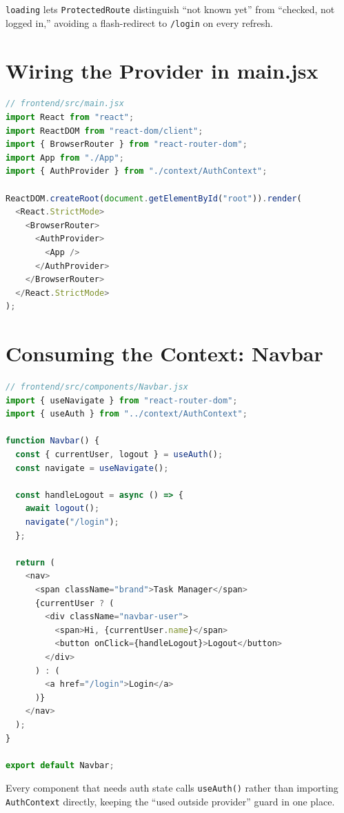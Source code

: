 \begin{notebox}[NOTE]
\texttt{loading} lets \texttt{ProtectedRoute} distinguish ``not known yet''
from ``checked, not logged in,'' avoiding a flash-redirect to
\texttt{/login} on every refresh.
\end{notebox}

\section{Wiring the Provider in main.jsx}

\begin{lstlisting}[language=JavaScript]
// frontend/src/main.jsx
import React from "react";
import ReactDOM from "react-dom/client";
import { BrowserRouter } from "react-router-dom";
import App from "./App";
import { AuthProvider } from "./context/AuthContext";

ReactDOM.createRoot(document.getElementById("root")).render(
  <React.StrictMode>
    <BrowserRouter>
      <AuthProvider>
        <App />
      </AuthProvider>
    </BrowserRouter>
  </React.StrictMode>
);
\end{lstlisting}

\section{Consuming the Context: Navbar}

\begin{lstlisting}[language=JavaScript]
// frontend/src/components/Navbar.jsx
import { useNavigate } from "react-router-dom";
import { useAuth } from "../context/AuthContext";

function Navbar() {
  const { currentUser, logout } = useAuth();
  const navigate = useNavigate();

  const handleLogout = async () => {
    await logout();
    navigate("/login");
  };

  return (
    <nav>
      <span className="brand">Task Manager</span>
      {currentUser ? (
        <div className="navbar-user">
          <span>Hi, {currentUser.name}</span>
          <button onClick={handleLogout}>Logout</button>
        </div>
      ) : (
        <a href="/login">Login</a>
      )}
    </nav>
  );
}

export default Navbar;
\end{lstlisting}

\begin{tipbox}[TIP]
Every component that needs auth state calls \texttt{useAuth()} rather than
importing \texttt{AuthContext} directly, keeping the ``used outside
provider'' guard in one place.
\end{tipbox}
